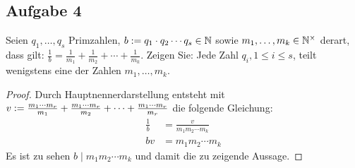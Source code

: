 \subsection{Aufgabe 4}
Seien $q_1,\dotsc,q_s$ Primzahlen, $b := q_1 \cdot q_2 \dotsm q_s \in \mathbb{N}$
sowie $m_1,\dotsc,m_k \in \mathbb{N}^\times$ derart, dass gilt:
$\frac{1}{b} = \frac{1}{m_1} + \frac{1}{m_2} + \dotsb + \frac{1}{m_k}$.
Zeigen Sie: Jede Zahl $q_i, 1 \leq i \leq s$, teilt wenigstens eine der Zahlen $m_1,\dotsc,m_k$.
\begin{proof}
  Durch Hauptnennerdarstellung entsteht mit $v := \frac{m_1 \dotsm m_r}{m_1} +
    \frac{m_1 \dotsm m_r}{m_2} + \dotsb + \frac{m_1 \dotsm m_r}{m_r}$
  die folgende Gleichung:
  \begin{equation*}
    \begin{aligned}
      \frac{1}{b} & = \frac{v}{m_1m_2 \dotsm m_k} \\
      bv          & = m_1m_2 \dotsm m_k
    \end{aligned}
  \end{equation*}
  Es ist zu sehen $b \mid m_1m_2 \dotsm m_k$ und damit die zu zeigende Aussage.
\end{proof}

